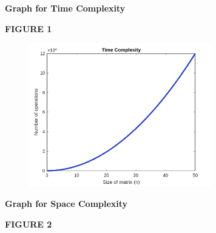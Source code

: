 \documentclass[14pt]{article}
\renewcommand{\_}{\kern-1.5pt\textunderscore\kern-1.5pt}
\begin{document}
\begin{multicols}{2}
\begin{enumerate}
\vspace{\baselineskip}

\vspace{\baselineskip}

\vspace{\baselineskip}
\begin{justify}
\textbf{Graph for Time Complexity}
\end{justify}

\vspace{\baselineskip}
\begin{Center}
\textbf{FIGURE 1}
\end{Center}

\vspace{\baselineskip}

\vspace{\baselineskip}



\begin{figure}[H]
	\begin{Center}
		\includegraphics[width=3.12in,height=2.46in]{./image1.png}
	\end{Center}
\end{figure}




\vspace{\baselineskip}\begin{justify}
\textbf{Graph for Space Complexity}
\end{justify}

\vspace{\baselineskip}
\begin{Center}
\textbf{FIGURE 2}
\end{Center}




\end{enumerate}
\end{multicols}
\end{document}
